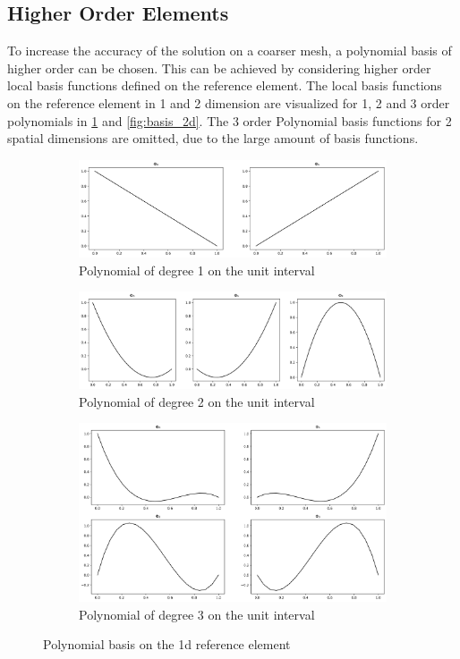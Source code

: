 \documentclass[11pt,a4paper]{article}
\begin{document}
\subsection*{Higher Order Elements}
To increase the accuracy of the solution on a coarser mesh, a polynomial basis
of higher order can be chosen. This can be achieved by considering higher order local
basis functions defined on the reference element. The local basis functions on the reference
element in 1 and 2 dimension are visualized for 1, 2 and 3 order polynomials in \ref{fig:basis_1d}
and \ref{fig:basis_2d}.
The 3 order Polynomial basis functions for 2 spatial dimensions are omitted, due to the
large amount of basis functions.

\begin{figure}
  \centering
  \begin{subfigure}{1.\textwidth}
    \centering
    \includegraphics[width=.8\linewidth]{p1_mesh_basis}
    \caption{Polynomial of degree 1 on the unit interval}
  \end{subfigure}
  \begin{subfigure}{1.\textwidth}
    \centering
    \includegraphics[width=.8\linewidth]{p2_mesh_basis}
    \caption{Polynomial of degree 2 on the unit interval}
  \end{subfigure}
  \begin{subfigure}{1.\textwidth}
    \centering
    \includegraphics[width=.8\linewidth]{p3_mesh_basis}
    \caption{Polynomial of degree 3 on the unit interval}
  \end{subfigure}
  \caption{Polynomial basis on the 1d reference element}
  \label{fig:basis_1d}
\end{figure}
\end{document}
